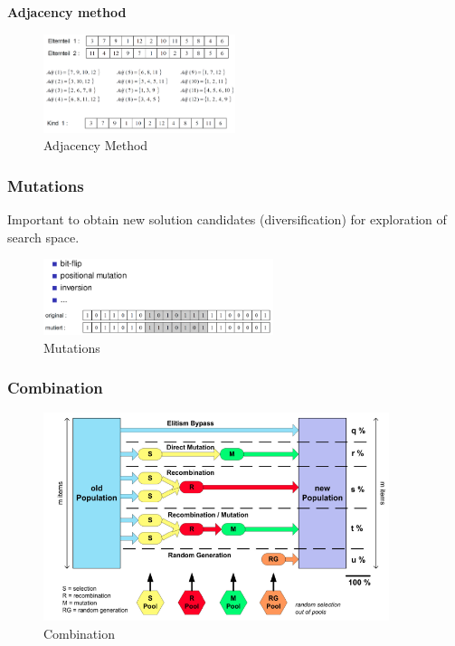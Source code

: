 \textbf{Adjacency method}
\begin{figure}[H]
\centering
\includegraphics[width=0.5\textwidth]{figures/adjacencyMethod.png}
\caption{Adjacency Method}
\end{figure}

\clearpage
\subsubsection{Mutations}
Important to obtain new solution candidates (diversification) for exploration of search space.

\begin{figure}[H]
\centering
\includegraphics[width=0.6\textwidth]{figures/mutations.png}
\caption{Mutations}
\end{figure}

\subsubsection{Combination}

\begin{figure}[H]
\centering
\includegraphics[width=0.9\textwidth]{figures/combination.png}
\caption{Combination}
\end{figure}

